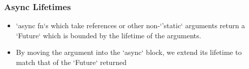 \begin{frame}[fragile]
    \frametitle{Async Lifetimes}
% 
% 
    \begin{itemize}
        \item `async fn`s which take references or other non-`'static` arguments return a `Future` which is bounded by the lifetime of the arguments.
    \end{itemize}
% 
% 
% 
    \begin{itemize}
        \item By moving the argument into the `async` block, we extend its lifetime to match that of the `Future` returned
    \end{itemize}
% 
% 
% 
\end{frame}
